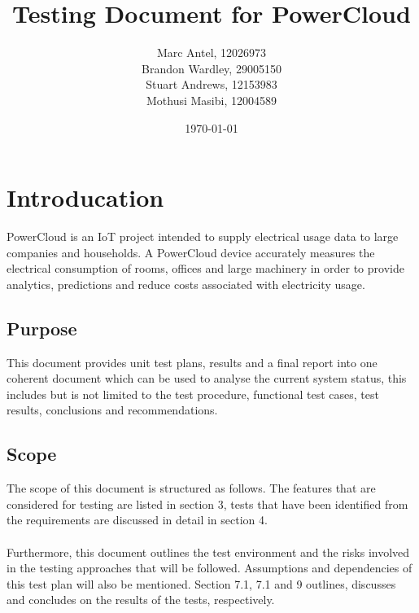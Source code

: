 \documentclass[a4paper,10pt]{article}
\title{Testing Document for PowerCloud}
\author{Marc Antel, 12026973\\ Brandon Wardley, 29005150\\ Stuart Andrews, 12153983\\ Mothusi Masibi, 12004589}
\date{\today}
\begin{document}
	\maketitle
	\newpage
	
	\section{Introducation}
	PowerCloud is an IoT project intended to supply electrical usage data to large companies and 
	households. A PowerCloud device accurately measures the electrical consumption of rooms, offices and 
	large machinery in order to provide analytics, predictions and reduce costs associated with electricity 
	usage.
	
		\subsection{Purpose}
		This document provides unit test plans, results and a final report into one coherent document which can be used to analyse the current system status, this includes but is not limited to the test procedure, functional test cases, test results, conclusions and recommendations.
		
		\subsection{Scope}
		The scope of this document is structured as 
		follows. The features that are considered for
		testing are listed in section 3, tests that have 
		been identified from the requirements are
		discussed in detail in section 4.\\\\Furthermore, 
		this document outlines the test environment
		and the risks involved in the testing approaches 
		that will be followed. Assumptions and
		dependencies of this test plan will also be 
		mentioned. Section 7.1, 7.1 and 9 outlines,
		discusses and concludes on the results of the 
		tests, respectively.
		
\end{document}
